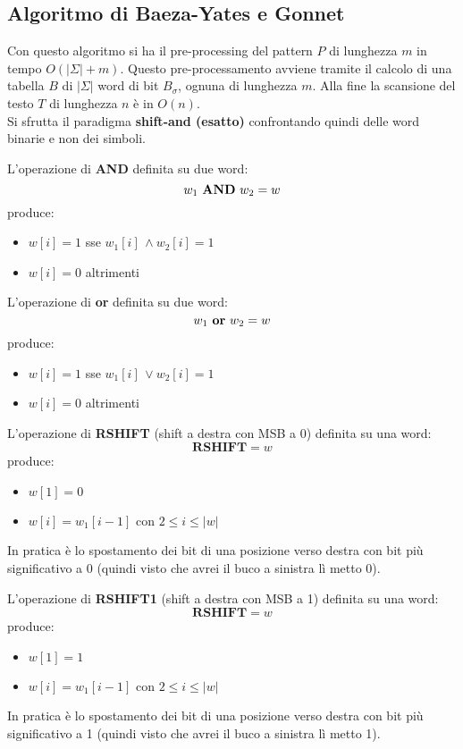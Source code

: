 \subsection{Algoritmo di Baeza-Yates e Gonnet}
Con questo algoritmo si ha il pre-processing del pattern $P$ di lunghezza $m$ in
tempo $O(|\Sigma|+m)$. Questo pre-processamento avviene tramite il calcolo di una
tabella $B$ di $|\Sigma|$ word di bit $B_\sigma$, ognuna di lunghezza
$m$. Alla fine la scansione del testo $T$ di lunghezza $n$ è in $O(n)$.\\
Si sfrutta il paradigma \textbf{shift-and (esatto)} confrontando quindi delle
word binarie e non dei simboli.
\begin{definizione}
  L'operazione di \textbf{AND} definita su due word:
  \[w_1\mbox{ \textbf{AND} }w_2=w\]
  produce:
  \begin{itemize}
    \item $w[i]=1$ sse $w_1[i]\,\land w_2[i]=1$
    \item $w[i]=0$ altrimenti
  \end{itemize}
\end{definizione}
\begin{definizione}
  L'operazione di \textbf{or} definita su due word:
  \[w_1\mbox{ \textbf{or} }w_2=w\]
  produce:
  \begin{itemize}
    \item $w[i]=1$ sse $w_1[i]\,\lor w_2[i]=1$
    \item $w[i]=0$ altrimenti
  \end{itemize}
\end{definizione}
\begin{definizione}
  L'operazione di \textbf{RSHIFT} (shift a destra con MSB a 0) definita su una
  word: 
  \[\mathbf{RSHIFT}=w\]
  produce:
  \begin{itemize}
    \item $w[1]=0$
    \item $w[i]=w_1[i-1]$ con $2\leq i\leq |w|$
  \end{itemize}
  In pratica è lo spostamento dei bit di una posizione verso destra con bit più
  significativo a 0 (quindi visto che avrei il buco a sinistra lì metto 0).
\end{definizione}
\begin{definizione}
  L'operazione di \textbf{RSHIFT1} (shift a destra con MSB a 1) definita su una word:
  \[\mathbf{RSHIFT}=w\]
  produce:
  \begin{itemize}
    \item $w[1]=1$
    \item $w[i]=w_1[i-1]$ con $2\leq i\leq |w|$
  \end{itemize}
  In pratica è lo spostamento dei bit di una posizione verso destra con bit più
  significativo a 1 (quindi visto che avrei il buco a sinistra lì metto 1).
\end{definizione}
